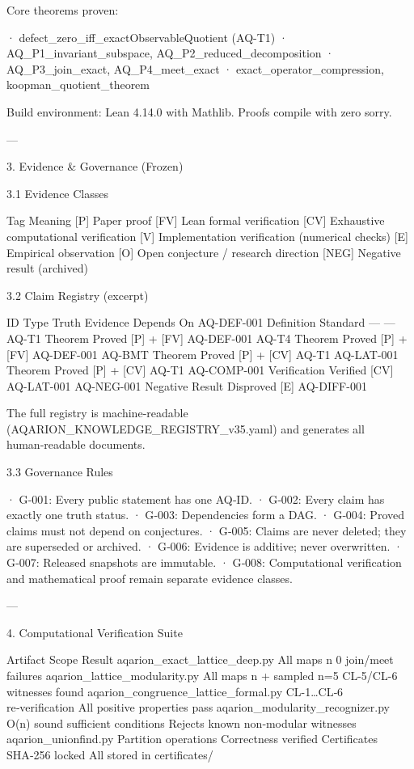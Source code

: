{{{{{{{{{{{{{Core theorems proven:

· defect_zero_iff_exactObservableQuotient (AQ-T1)
· AQ_P1_invariant_subspace, AQ_P2_reduced_decomposition
· AQ_P3_join_exact, AQ_P4_meet_exact
· exact_operator_compression, koopman_quotient_theorem

Build environment: Lean 4.14.0 with Mathlib. Proofs compile with zero sorry.

---

3. Evidence & Governance (Frozen)

3.1 Evidence Classes

Tag Meaning
[P] Paper proof
[FV] Lean formal verification
[CV] Exhaustive computational verification
[V] Implementation verification (numerical checks)
[E] Empirical observation
[O] Open conjecture / research direction
[NEG] Negative result (archived)

3.2 Claim Registry (excerpt)

ID Type Truth Evidence Depends On
AQ-DEF-001 Definition Standard — —
AQ-T1 Theorem Proved [P] + [FV] AQ-DEF-001
AQ-T4 Theorem Proved [P] + [FV] AQ-DEF-001
AQ-BMT Theorem Proved [P] + [CV] AQ-T1
AQ-LAT-001 Theorem Proved [P] + [CV] AQ-T1
AQ-COMP-001 Verification Verified [CV] AQ-LAT-001
AQ-NEG-001 Negative Result Disproved [E] AQ-DIFF-001

The full registry is machine‑readable (AQARION_KNOWLEDGE_REGISTRY_v35.yaml) and generates all human‑readable documents.

3.3 Governance Rules

· G‑001: Every public statement has one AQ‑ID.
· G‑002: Every claim has exactly one truth status.
· G‑003: Dependencies form a DAG.
· G‑004: Proved claims must not depend on conjectures.
· G‑005: Claims are never deleted; they are superseded or archived.
· G‑006: Evidence is additive; never overwritten.
· G‑007: Released snapshots are immutable.
· G‑008: Computational verification and mathematical proof remain separate evidence classes.

---

4. Computational Verification Suite

Artifact Scope Result
aqarion_exact_lattice_deep.py All maps n 0 join/meet failures
aqarion_lattice_modularity.py All maps n + sampled n=5 CL-5/CL-6 witnesses found
aqarion_congruence_lattice_formal.py CL-1…CL‑6 re‑verification All positive properties pass
aqarion_modularity_recognizer.py O(n) sound sufficient conditions Rejects known non‑modular witnesses
aqarion_unionfind.py Partition operations Correctness verified
Certificates SHA‑256 locked All stored in certificates/

}}}}}}}}}}}}}
